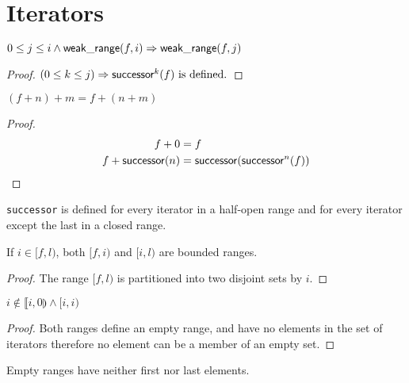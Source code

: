 \chapter{Iterators}

\begin{lemma}
	$0 \leq j \leq i \wedge \mathsf{weak\_range}(f, i) \Rightarrow \mathsf{weak\_range}(f, j)$
\end{lemma}

\begin{proof}
	$(0 \leq k \leq j) \Rightarrow \mathsf{successor}^k(f) \text{ is defined.}$
\end{proof}

\begin{lemma}
	$(f + n) + m = f + (n + m)$
\end{lemma}

\begin{proof}
	\begin{align*}
		f + 0 &= f\\
		f + \mathsf{successor}(n) &= \mathsf{successor}(\mathsf{successor}^n(f))
	\end{align*}
\end{proof}

\begin{lemma}
	\verb|successor| is defined for every iterator in a half-open range and for every iterator
	except the last in a closed range.
\end{lemma}

\begin{lemma}
	If $i \in [f, l)$, both $[f, i)$ and $[i, l)$ are bounded ranges.
\end{lemma}

\begin{proof}
	The range $[f, l)$ is partitioned into two disjoint sets by $i$.
\end{proof}

\begin{lemma}
	$i \notin \llbracket i, 0 \rrparenthesis \wedge [i, i)$
\end{lemma}

\begin{proof}
	Both ranges define an empty range, and have no elements in the set of iterators therefore
	no element can be a member of an empty set.
\end{proof}

\begin{lemma}
	Empty ranges have neither first nor last elements.
\end{lemma}

